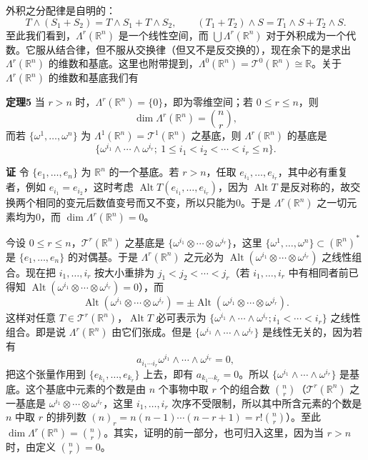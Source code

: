 外积之分配律是自明的：
\begin{equation}
 T\wedge(S_1+S_2)=T\wedge S_1+T\wedge S_2,
 \qquad (T_1+T_2)\wedge S=T_1\wedge S+T_2\wedge S.
 \tag{26}
\end{equation}
至此我们看到，$\Lambda^r(\mathbb R^n)$ 是一个线性空间，而 $\bigcup\Lambda^r(\mathbb R^n)$ 对于外积成为一个代数。它服从结合律，但不服从交换律（但又不是反交换的），现在余下的是求出 $\Lambda^r(\mathbb R^n)$ 的维数和基底。这里也附带提到，$\Lambda^0(\mathbb R^n)=\mathcal T^0(\mathbb R^n)\cong\mathbb R$。关于 $\Lambda^r(\mathbb R^n)$ 的维数和基底我们有

\noindent\textbf{定理5}
当 $r>n$ 时，$\Lambda^r(\mathbb R^n)=\{0\}$，即为零维空间；若 $0\le r\le n$，则
\[
 \dim\Lambda^r(\mathbb R^n)=\binom nr,
\]
而若 $\{\omega^1,\ldots,\omega^n\}$ 为 $\Lambda^1(\mathbb R^n)=\mathcal T^1(\mathbb R^n)$ 之基底，则 $\Lambda^r(\mathbb R^n)$ 的基底是
\begin{equation}
 \{\omega^{i_1}\wedge\cdots\wedge\omega^{i_r};\ 1\le i_1<i_2<\cdots<i_r\le n\}.
 \tag{27}
\end{equation}

\noindent\textbf{证}
令 $\{e_1,\ldots,e_n\}$ 为 $\mathbb R^n$ 的一个基底。若 $r>n$，任取 $e_{i_1},\ldots,e_{i_r}$，其中必有重复者，例如 $e_{i_1}=e_{i_2}$，这时考虑 $\operatorname{Alt}T(e_{i_1},\ldots,e_{i_r})$，因为 $\operatorname{Alt}T$ 是反对称的，故交换两个相同的变元后数值变号而又不变，所以只能为0。于是 $\Lambda^r(\mathbb R^n)$ 之一切元素均为0，而 $\dim\Lambda^r(\mathbb R^n)=0$。

今设 $0\le r\le n$，$\mathcal T^r(\mathbb R^n)$ 之基底是 $\{\omega^{i_1}\otimes\cdots\otimes\omega^{i_r}\}$，这里 $\{\omega^1,\ldots,\omega^n\}\subset(\mathbb R^n)^*$ 是 $\{e_1,\ldots,e_n\}$ 的对偶基。于是 $\Lambda^r(\mathbb R^n)$ 之元必为 $\operatorname{Alt}(\omega^{i_1}\otimes\cdots\otimes\omega^{i_r})$ 之线性组合。现在把 $i_1,\ldots,i_r$ 按大小重排为 $j_1<j_2<\cdots<j_r$（若 $i_1,\ldots,i_r$ 中有相同者前已得知 $\operatorname{Alt}(\omega^{i_1}\otimes\cdots\otimes\omega^{i_r})=0$），而
\[
 \operatorname{Alt}(\omega^{i_1}\otimes\cdots\otimes\omega^{i_r})
 =\pm\operatorname{Alt}(\omega^{j_1}\otimes\cdots\otimes\omega^{j_r}).
\]
这样对任意 $T\in\mathcal T^r(\mathbb R^n)$，$\operatorname{Alt}T$ 必可表示为 $\{\omega^{i_1}\wedge\cdots\wedge\omega^{i_r};i_1<\cdots<i_r\}$ 之线性组合。即是说 $\Lambda^r(\mathbb R^n)$ 由它们张成。但是 $\{\omega^{i_1}\wedge\cdots\wedge\omega^{i_r}\}$ 是线性无关的，因为若有
\[
 a_{i_1\cdots i_r}\omega^{i_1}\wedge\cdots\wedge\omega^{i_r}=0,
\]
把这个张量作用到 $\{e_{k_1},\ldots,e_{k_r}\}$ 上去，即有 $a_{k_1\cdots k_r}=0$。所以 $\{\omega^{i_1}\wedge\cdots\wedge\omega^{i_r}\}$ 是基底。这个基底中元素的个数是由 $n$ 个事物中取 $r$ 个的组合数 $\binom nr$（$\mathcal T^r(\mathbb R^n)$ 之一基底是 $\omega^{i_1}\otimes\cdots\otimes\omega^{i_r}$，这里 $i_1,\ldots,i_r$ 次序不受限制，所以其中所含元素的个数是 $n$ 中取 $r$ 的排列数 $(n)_r=n(n-1)\cdots(n-r+1)=r!\binom nr$）。至此 $\dim\Lambda^r(\mathbb R^n)=\binom nr$。其实，证明的前一部分，也可归入这里，因为当 $r>n$ 时，由定义 $\binom nr=0$。

